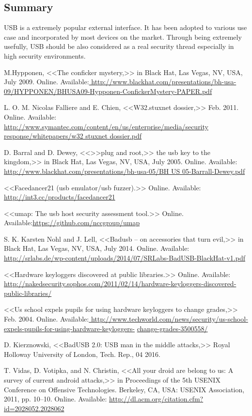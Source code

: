 \documentclass[10pt, a5paper]{article}
\begin{document}
\subsection*{Summary}
USB is a extremely popular external interface. It has been adopted to various use case and incorporated by most devices on the market. Through being extremely usefully, USB should be also considered as a real security thread especially in high security environments.
\begin{thebibliography}{99}
 M.Hypponen, <<The conficker mystery,>> in Black Hat, Las Vegas, NV, USA, July 2009. Online. Available:\url{ http://www.blackhat.com/presentations/bh-usa-09/HYPPONEN/BHUSA09-Hypponen-ConfickerMystery-PAPER.pdf}

 L. O. M. Nicolas Falliere and E. Chien, <<W32.stuxnet dossier,>> Feb. 2011. Online. Available:\url{ http://www.symantec.com/content/en/us/enterprise/media/security response/whitepapers/w32 stuxnet dossier.pdf}

 D. Barral and D. Dewey, <<>>plug and root,>> the usb key to the kingdom,>> in Black Hat, Las Vegas, NV, USA, July 2005. Online. Available:\url{ http://www.blackhat.com/presentations/bh-usa-05/BH US 05-Barrall-Dewey.pdf}

 <<Facedancer21 (usb emulator/usb fuzzer).>> Online. Available:\url{ http://int3.cc/products/facedancer21}

 <<umap: The usb host security assessment tool.>> Online. Available:\url{https://github.com/nccgroup/umap}

 S. K. Karsten Nohl and J. Lell, <<Badusb – on accessories that turn evil,>> in Black Hat, Las Vegas, NV, USA, July 2014. Online. Available:\url{ http://srlabs.de/wp-content/uploads/2014/07/SRLabs-BadUSB-BlackHat-v1.pdf}

 <<Hardware keyloggers discovered at public libraries.>> Online.
Available:\url{ http://nakedsecurity.sophos.com/2011/02/14/hardware-keyloggers-discovered-public-libraries/}

 <<Us school expels pupils for using hardware keyloggers to change grades,>>
Feb. 2004. Online. Available:\url{ http://www.techworld.com/news/security/us-school-expels-pupils-for-using-hardware-keyloggers-} \linebreak \url{change-grades-3500558/}

 D. Kierznowski, <<BadUSB 2.0: USB man in the middle attacks,>> Royal
Holloway University of London, Tech. Rep., 04 2016.

 T. Vidas, D. Votipka, and N. Christin, <<All your droid are belong to us: A survey of current android attacks,>> in Proceedings of the 5th USENIX Conference on Offensive Technologies. Berkeley, CA, USA: USENIX Association, 2011, pp. 10–10. Online. Available:
\url{http://dl.acm.org/citation.cfm?id=2028052.2028062}

\end{thebibliography}
\end{document}
